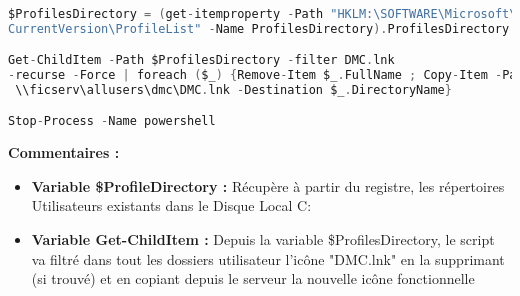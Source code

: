 \documentclass[11pt,a4paper,oneside]{article}
\begin{document}
\begin{lstlisting}[language=C]

$ProfilesDirectory = (get-itemproperty -Path "HKLM:\SOFTWARE\Microsoft\Windows NT\
CurrentVersion\ProfileList" -Name ProfilesDirectory).ProfilesDirectory

Get-ChildItem -Path $ProfilesDirectory -filter DMC.lnk 
-recurse -Force | foreach ($_) {Remove-Item $_.FullName ; Copy-Item -Path
 \\ficserv\allusers\dmc\DMC.lnk -Destination $_.DirectoryName}

Stop-Process -Name powershell

\end{lstlisting}
\textbf{Commentaires :}\\
\begin{itemize}
\item \textbf{Variable \$ProfileDirectory :} Récupère à partir du registre, les répertoires Utilisateurs existants dans le Disque Local C: 
\item \textbf{Variable Get-ChildItem :} Depuis la variable \$ProfilesDirectory, le script va filtré dans tout les dossiers utilisateur l'icône "DMC.lnk" en la supprimant (si trouvé) et en copiant depuis le serveur la nouvelle icône fonctionnelle 
\end{itemize}
\end{document}
